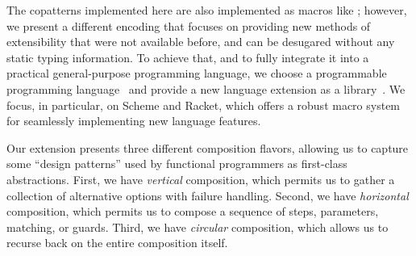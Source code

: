 The copatterns implemented here are also implemented as macros like \cite{LaforgueR17}; however, we present a different encoding that focuses on providing new methods of extensibility that were not available before, and can be desugared without any static typing information.
To achieve that, and to fully integrate it into a practical general-purpose programming language, we choose a programmable programming language~\cite{ProgrammablePL} and provide a new language extension as a library~\cite{LanguageLibrary}.
We focus, in particular, on Scheme and Racket, which offers a robust macro system for seamlessly implementing new language features.

Our extension presents three different composition flavors, allowing us to capture some ``design patterns'' used by functional programmers as first-class abstractions.
First, we have \emph{vertical} composition, which permits us to gather a collection of alternative options with failure handling.
Second, we have \emph{horizontal} composition, which permits us to compose a sequence of steps, parameters, matching, or guards.
Third, we have \emph{circular} composition, which allows us to recurse back on the entire composition itself.

